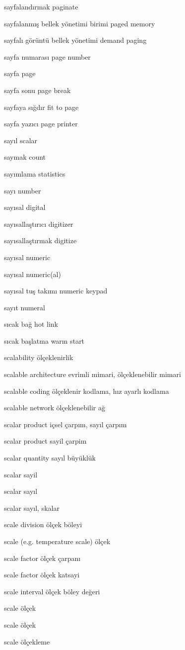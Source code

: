 \documentclass[12pt,fleqn]{article}\usepackage{../../common}
\begin{document}
sayfalandırmak paginate

sayfalanmış bellek yönetimi birimi paged memory

sayfalı görüntü bellek yönetimi demand paging

sayfa numarası page number

sayfa page

sayfa sonu page break

sayfaya sığdır fit to page

sayfa yazıcı page printer

sayıl scalar

saymak count

sayımlama statistics

sayı number

sayısal digital

sayısallaştırıcı digitizer

sayısallaştırmak digitize

sayısal numeric

sayısal numeric(al)

sayısal tuş takımı numeric keypad

sayıt numeral

sıcak bağ hot link

sıcak başlatma warm start

scalability ölçeklenirlik

scalable architecture evrimli mimari, ölçeklenebilir mimari

scalable coding ölçeklenir kodlama, hız ayarlı kodlama

scalable network ölçeklenebilir ağ

scalar product içsel çarpım, sayıl çarpım

scalar product sayil çarpim

scalar quantity sayıl büyüklük

scalar sayil

scalar sayıl

scalar sayıl, skalar

scale division ölçek böleyi

scale (e.g. temperature scale) ölçek

scale factor ölçek çarpanı

scale factor ölçek katsayi

scale interval ölçek böley değeri

scale ölçek

scale ölçek

scale ölçekleme
\end{document}

